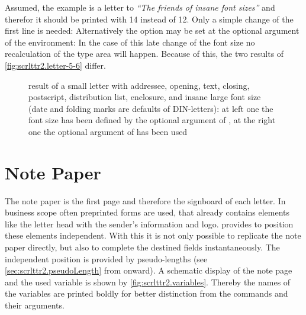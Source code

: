 \begin{Example}
  Assumed, the example is a letter to \emph{``The friends of insane font
    sizes''} and therefor it should be printed with 14 instead of
  12. Only a simple change of the first line is needed:%
  Alternatively the option may be set at the optional argument of the
   environment:%
  In the case of this late change of the font size no recalculation of the
  type area will happen. Because of this, the two results of
  \autoref{fig:scrlttr2.letter-5-6} differ.
  \begin{figure}
    \centering
    \quad
    \caption[{Example: letter with addressee, opening, text,
        closing, postscript, distribution list, enclosure, and insane large
        font size}]{%
        result of a small letter with addressee, opening, text, closing,
        postscript, distribution list, enclosure, and insane large font size
        (date and folding marks are defaults of DIN-letters): at left one the
        font size has been defined by the optional argument of
        , at the right one the optional argument of
         has been used}
    \label{fig:scrlttr2.letter-5-6}
  \end{figure}
\end{Example}
%
%
%


\section{Note Paper}
\label{sec:scrlttr2.firstpage}
%

The note paper is the first page and therefore the signboard of each
letter. In business scope often preprinted forms are used, that already
contains elements like the letter head with the sender's information and
logo. \KOMAScript{} provides to position these elements independent. With this
it is not only possible to replicate the note paper directly, but also to
complete the destined fields instantaneously. The independent position is
provided by pseudo-lengths (see \autoref{sec:scrlttr2.pseudoLength} from
 onward). A schematic display of the
note page and the used variable is shown by
\autoref{fig:scrlttr2.variables}. Thereby the names of the variables are
printed boldly for better distinction from the commands and their arguments.

